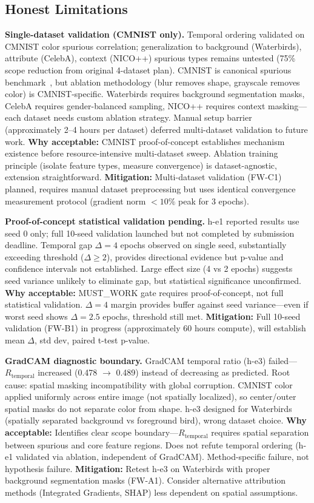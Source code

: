 \subsection{Honest Limitations}

\textbf{Single-dataset validation (CMNIST only).} Temporal ordering validated on CMNIST color spurious correlation; generalization to background (Waterbirds), attribute (CelebA), context (NICO++) spurious types remains untested (75\% scope reduction from original 4-dataset plan). CMNIST is canonical spurious benchmark~\cite{arjovsky2019invariant}, but ablation methodology (blur removes shape, grayscale removes color) is CMNIST-specific. Waterbirds requires background segmentation masks, CelebA requires gender-balanced sampling, NICO++ requires context masking---each dataset needs custom ablation strategy. Manual setup barrier (approximately 2--4 hours per dataset) deferred multi-dataset validation to future work. \textbf{Why acceptable:} CMNIST proof-of-concept establishes mechanism existence before resource-intensive multi-dataset sweep. Ablation training principle (isolate feature types, measure convergence) is dataset-agnostic, extension straightforward. \textbf{Mitigation:} Multi-dataset validation (FW-C1) planned, requires manual dataset preprocessing but uses identical convergence measurement protocol (gradient norm $< 10\%$ peak for 3 epochs).

\textbf{Proof-of-concept statistical validation pending.} h-e1 reported results use seed 0 only; full 10-seed validation launched but not completed by submission deadline. Temporal gap $\Delta=4$ epochs observed on single seed, substantially exceeding threshold ($\Delta \geq 2$), provides directional evidence but p-value and confidence intervals not established. Large effect size (4 vs 2 epochs) suggests seed variance unlikely to eliminate gap, but statistical significance unconfirmed. \textbf{Why acceptable:} MUST\_WORK gate requires proof-of-concept, not full statistical validation. $\Delta=4$ margin provides buffer against seed variance---even if worst seed shows $\Delta=2.5$ epochs, threshold still met. \textbf{Mitigation:} Full 10-seed validation (FW-B1) in progress (approximately 60 hours compute), will establish mean $\Delta$, std dev, paired t-test p-value.

\textbf{GradCAM diagnostic boundary.} GradCAM temporal ratio (h-e3) failed---$R_{\text{temporal}}$ increased (0.478 $\rightarrow$ 0.489) instead of decreasing as predicted. Root cause: spatial masking incompatibility with global corruption. CMNIST color applied uniformly across entire image (not spatially localized), so center/outer spatial masks do not separate color from shape. h-e3 designed for Waterbirds (spatially separated background vs foreground bird), wrong dataset choice. \textbf{Why acceptable:} Identifies clear scope boundary---$R_{\text{temporal}}$ requires spatial separation between spurious and core feature regions. Does not refute temporal ordering (h-e1 validated via ablation, independent of GradCAM). Method-specific failure, not hypothesis failure. \textbf{Mitigation:} Retest h-e3 on Waterbirds with proper background segmentation masks (FW-A1). Consider alternative attribution methods (Integrated Gradients, SHAP) less dependent on spatial assumptions.

